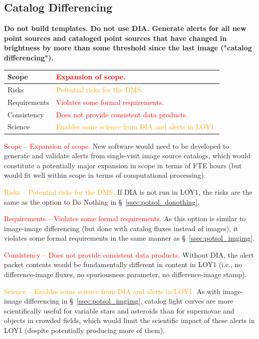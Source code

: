 \documentclass[DM,toc]{lsstdoc}
\begin{document}
\clearpage
\subsection{Catalog Differencing}\label{ssec:potsol_catdiff}

{\bf Do not build templates. Do not use DIA. Generate alerts for all new point sources and cataloged point sources that have changed in brightness by more than some threshold since the last image ("catalog differencing").}

\begin{center}
\begin{tabular}{|p{2.5cm}|p{13cm}|}
\hline
Scope & \textcolor{red}{Expansion of scope.}  \\
\hline
Risks & \textcolor{orange}{Potential risks for the DMS.} \\
\hline
Requirements & \textcolor{red}{Violates some formal requirements.} \\
\hline
Consistency & \textcolor{red}{Does not provide consistent data products.} \\
\hline
Science & \textcolor{orange}{Enables some science from DIA and alerts in LOY1.} \\
\hline
\end{tabular}
\end{center}

\textcolor{red}{Scope -- Expansion of scope.}
New software would need to be developed to generate and validate alerts from single-visit image source catalogs, which would constitute a potentially major expansion in scope in terms of FTE hours (but would fit well within scope in terms of computational processing).

\textcolor{orange}{Risks -- Potential risks for the DMS.}
If DIA is not run in LOY1, the risks are the same as the option to Do Nothing in \S~\ref{ssec:potsol_donothing}.

\textcolor{red}{Requirements -- Violates some formal requirements.}
As this option is similar to image-image differencing (but done with catalog fluxes instead of images), it violates some formal requirements in the same manner as \S~\ref{ssec:potsol_imgimg}.

\textcolor{red}{Consistency -- Does not provide consistent data products.}
Without DIA, the alert packet contents would be fundamentally different in content in LOY1 (i.e., no difference-image fluxes, no spuriousness parameter, no difference-image stamp).

\textcolor{orange}{Science -- Enables some science from DIA and alerts in LOY1.}
As with image-image differencing in \S~\ref{ssec:potsol_imgimg}, catalog light curves are more scientifically useful for variable stars and asteroids than for supernovae and objects in crowded fields, which would limit the scientific impact of these alerts in LOY1 (despite potentially producing more of them).
\end{document}
